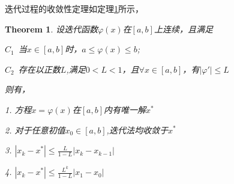 \documentclass[UTF8,zihao=5,a4paper]{ctexart}
\newtheorem{Theo}{Theorem}
\begin{document}
\begin{appendix}
迭代过程的收敛性定理如定理\ref{theo:apxB}所示，

\begin{Theo}
    \label{theo:apxB}
    设迭代函数$\varphi(x)$在$[a,b]$上连续，且满足
    
    $C_1$\ 当$x\in [a,b]$时，$a\leq\varphi(x)\leq b$;
    
    $C_2$\ 存在以正数$L$,满足$0<L<1$，且$\forall x\in [a,b]$，有$|\varphi '|\leq L$
    
    则有，
    
    1. 方程$x=\varphi(x)$在$[a,b]$内有唯一解$x^*$
    
    2. 对于任意初值$x_0\in [a,b]$,迭代法均收敛于$x^*$
    
    3. $|x_k-x^*|\leq \frac{L}{1-L}| x_k-x_{k-1} |$
    
    4. $|x_k-x^*|\leq \frac{L^k}{1-L}| x_1-x_0 |$
\end{Theo}

\end{appendix}
\end{document}
